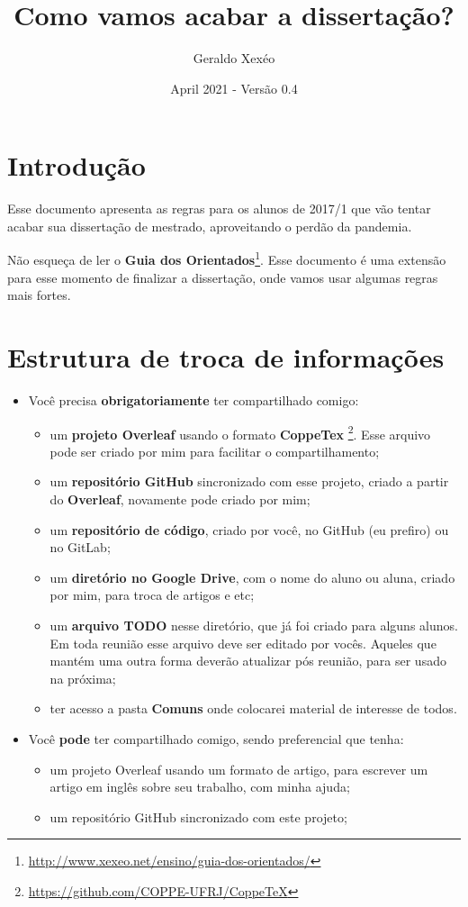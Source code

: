 \documentclass{article}
\title{Como vamos acabar a dissertação?}
\author{Geraldo Xexéo}
\date{April 2021 - Versão 0.4}
\begin{document}
\maketitle

\section{Introdução}

Esse documento apresenta as regras para os alunos de 2017/1 que vão tentar acabar sua dissertação de mestrado, aproveitando o perdão da pandemia.

Não esqueça de ler o \textbf{Guia dos Orientados}\footnote{\url{http://www.xexeo.net/ensino/guia-dos-orientados/}}. Esse documento é uma extensão para esse momento de finalizar a dissertação, onde vamos usar algumas regras mais fortes.

\section{Estrutura de troca de informações}

\begin{itemize}
    \item Você precisa \textbf{obrigatoriamente} ter compartilhado comigo:
    \begin{itemize}
        \item um \textbf{projeto Overleaf} usando o formato \textbf{CoppeTex} \footnote{\url{https://github.com/COPPE-UFRJ/CoppeTeX}}. Esse arquivo pode ser criado por mim para facilitar o compartilhamento;
        \item um \textbf{repositório GitHub} sincronizado com esse projeto, criado a partir do \textbf{Overleaf}, novamente pode criado por mim;
        \item um \textbf{repositório de código}, criado por você, no GitHub (eu prefiro) ou no GitLab;
        \item um \textbf{diretório no Google Drive}, com o nome do aluno ou aluna, criado por mim, para troca de artigos e etc;
        \item um \textbf{arquivo TODO} nesse diretório, que já foi criado para alguns alunos. Em toda reunião esse arquivo deve ser editado por vocês. Aqueles que mantém uma outra forma deverão atualizar pós reunião, para ser usado na próxima;
        \item ter acesso a pasta \textbf{Comuns} onde colocarei material de interesse de todos.
    \end{itemize}
    \item Você \textbf{pode} ter compartilhado comigo, sendo preferencial que tenha:
    \begin{itemize}
        \item um projeto Overleaf usando um formato de artigo, para escrever um artigo em inglês sobre seu trabalho, com minha ajuda;
        \item um repositório GitHub sincronizado com este projeto;
    \end{itemize}
\end{itemize}
\end{document}

